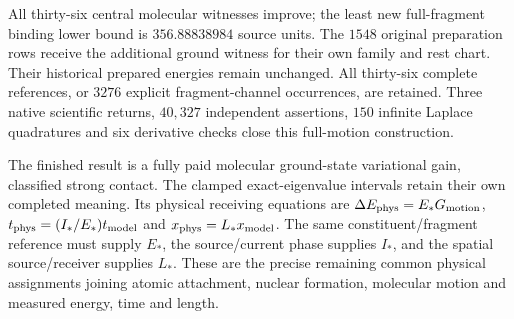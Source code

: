 All thirty-six central molecular witnesses improve; the least new full-fragment binding lower bound is $356.88838984$ source units. The $1548$ original preparation rows receive the additional ground witness for their own family and rest chart. Their historical prepared energies remain unchanged. All thirty-six complete references, or $3276$ explicit fragment-channel occurrences, are retained. Three native scientific returns, $40{,}327$ independent assertions, $150$ infinite Laplace quadratures and six derivative checks close this full-motion construction.

The finished result is a fully paid molecular ground-state variational gain, classified strong contact. The clamped exact-eigenvalue intervals retain their own completed meaning. Its physical receiving equations are $\Delta E_{\rm phys}=E_*G_{\rm motion}$, $t_{\rm phys}=(I_*/E_*)t_{\rm model}$ and $x_{\rm phys}=L_*x_{\rm model}$. The same constituent/fragment reference must supply $E_*$, the source/current phase supplies $I_*$, and the spatial source/receiver supplies $L_*$. These are the precise remaining common physical assignments joining atomic attachment, nuclear formation, molecular motion and measured energy, time and length.


